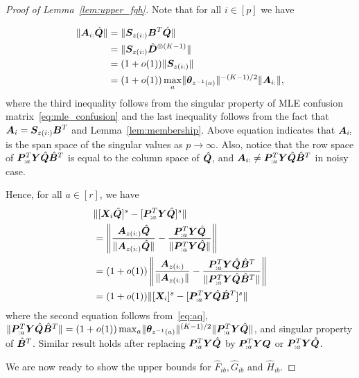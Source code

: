 \documentclass[journal]{IEEEtran}
\theoremstyle{definition}
\theoremstyle{definition}
\begin{document}
\begin{proof}[Proof of Lemma~\ref{lem:upper_fgh}]
{Note that for all $i \in [p]$ we have 

    \vspace{-0.5cm}
\small
\begin{align}
    \onormSize{}{\mA_{i:} \hat \mQ} &= \onormSize{}{\mS_{z(i:)} \mB^T \hat \mQ }\\
    &=  \onormSize{}{\mS_{z(i:)} \hat \mD^{\otimes (K-1)} }\\
    &=  (1 + o(1)) \onormSize{}{\mS_{z(i:)}} \\
    &=  (1 + o(1)) \max_{a} \onormSize{}{\mtheta_{z^{-1}(a)}}^{-(K-1)/2} \onormSize{}{\mA_{i:}},  \label{eq:aq}
\end{align}
\normalsize
where the third inequality follows from the singular property of MLE confusion matrix~\eqref{eq:mle_confusion} and the last inequality follows from the fact that $\bm A_i = \bm S_{z(i:)} \bm B^T$ and Lemma~\ref{lem:membership}. Above equation indicates that $\bm A_{i:}$ is the span space of the singular values as $p \rightarrow \infty$. Also, notice that the row space of $\bm{P}_{:a}^T \bm Y \hat {\bm{Q}}  \hat {\bm B}^T$ is equal to the column space of $\hat {\bm{Q}}$, and $\bm A_{i:} \neq \bm{P}_{:a}^T \bm Y \hat {\bm{Q}}  \hat {\bm B}^T$ in noisy case. 

Hence, for all $a \in [r]$, we have 
\begin{align}
    &\onormSize{}{ [\mX_i \hat \mQ]^s - [\mP_{:a}^T \mY \hat \mQ ]^s } \\
    &= \onorm{ \frac{\mA_{z(i:)} \hat \mQ  }{\onormSize{}{\mA_{z(i:)} \hat \mQ }} - \frac{\mP_{:a}^T \mY \hat \mQ  }{ \onormSize{}{\mP_{:a}^T \mY \hat \mQ} } } \\
    &= (1+o(1))  \onorm{ \frac{\mA_{z(i:)} }{\onormSize{}{\mA_{z(i:)} }} - \frac{\mP_{:a}^T \mY \hat \mQ \hat \mB^T  }{ \onormSize{}{\mP_{:a}^T \mY \hat \mQ \hat \mB^T} } } \\
    &= (1+o(1)) \onormSize{}{ [\mX_i]^s - [\mP_{:a}^T \mY \hat \mQ \hat \mB^T ]^s } \label{eq:angle_aq}
\end{align}
where the second equation follows from~\eqref{eq:aq}, $\lVert\bm{P}_{:a}^T \bm Y \hat {\bm{Q}} \hat {\bm B}^T\rVert = (1 + o(1)) \max_{a} \lVert\boldsymbol{\theta}_{z^{-1}(a)}\rVert^{(K-1)/2} \lVert\bm{P}_{:a}^T \bm Y \hat {\bm{Q}} \rVert $, and singular property of $\hat {\bm B}^T$. Similar result holds after replacing $\bm{P}_{:a}^T \bm Y \hat {\bm{Q}}$ by  $\bm{P}_{:a}^T \bm Y\bm{Q}$ or $\bm{P}_{:a}^T \bm Y \hat {\bm{Q}}$.

We are now ready to show the upper bounds for $\hat F_{ib},\hat G_{ib}$ and $\hat H_{ib}$.

}
\end{proof}
\end{document}
